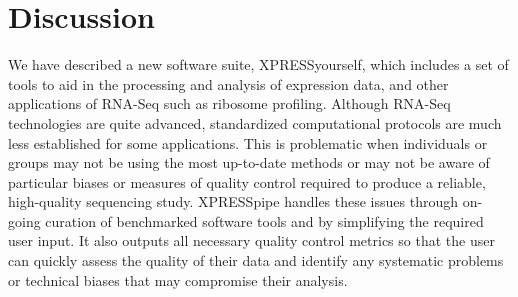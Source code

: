 \documentclass[10pt, oneside]{article}
\begin{document}



\section{Discussion}
We have described a new software suite, XPRESSyourself, which includes a set of tools to aid in the processing and analysis of expression data, and other applications of RNA-Seq such as ribosome profiling. Although RNA-Seq technologies are quite advanced, standardized computational protocols are much less established for some applications. This is problematic when individuals or groups may not be using the most up-to-date methods or may not be aware of particular biases or measures of quality control required to produce a reliable, high-quality sequencing study. XPRESSpipe handles these issues through on-going curation of benchmarked software tools and by simplifying the required user input. It also outputs all necessary quality control metrics so that the user can quickly assess the quality of their data and identify any systematic problems or technical biases that may compromise their analysis. \par
\end{document}
